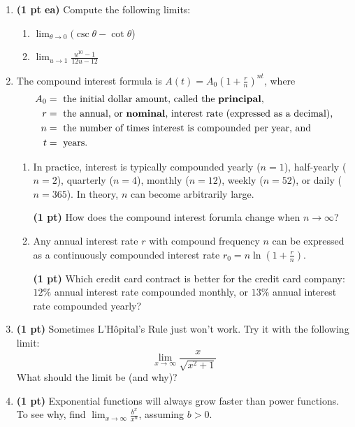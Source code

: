 \documentclass[12pt]{article}
\begin{document}
\begin{enumerate}
\item {\bf (1 pt ea)} Compute the following limits:
\begin{enumerate}
	\item $\lim_{\theta\to 0}(\csc{\theta}-\cot{\theta}$)
	\item $\lim_{u\to 1}\frac{u^{10}-1}{12u-12}$
\end{enumerate}


\item The compound interest formula is
$A(t)=A_0\left(1+\frac{r}{n}\right)^{nt}$, where 
\begin{align*}
A_0 &= \text{ the initial dollar amount, called the \textbf{principal},} \\
r &= \text{ the annual, or \textbf{nominal}, interest rate (expressed as a decimal),} \\
n &= \text{ the number of times interest is compounded per year, and} \\t &= \text{ years.}
\end{align*}
\begin{enumerate}
	\item In practice, interest is typically compounded yearly ($n=1$), half-yearly ($n=2$), quarterly ($n=4$), monthly ($n=12$), weekly ($n=52$), or daily ($n=365$).  In theory, $n$ can become arbitrarily large.  
	
	{\bf (1 pt)} How does the compound interest forumla change when $n\to\infty$?
	\vspace{0.5pc}
	
	\item Any annual interest rate $r$ with compound frequency $n$ can be expressed as a continuously compounded interest rate $r_0=n\ln{\left(1+\frac{r}{n}\right)}$.  
	
	{\bf (1 pt)} Which credit card contract is better for the credit card company: $12\%$ annual interest rate compounded monthly, or $13\%$ annual interest rate compounded yearly?
\end{enumerate}

\item {\bf (1 pt)} Sometimes L'H\^opital's Rule just won't work.  Try it with the following limit:
\[
\lim_{x\to\infty}\frac{x}{\sqrt{x^2+1}}
\]
What should the limit be (and why)?

\item {\bf (1 pt)} Exponential functions will always grow faster than power functions.  To see why, find $\displaystyle\lim_{x\to\infty}\frac{b^x}{x^n}$, assuming $b>0$.  


\end{enumerate}
\end{document}
